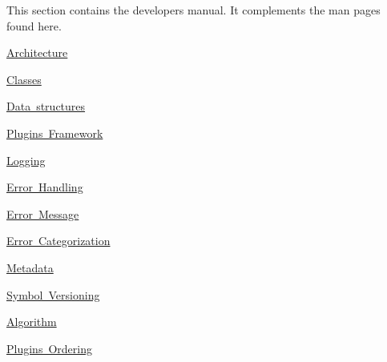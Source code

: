 This section contains the developer\textquotesingle{}s manual. It complements the man pages found here.


\begin{DoxyItemize}
\item \mbox{\hyperlink{doc_dev_architecture_md}{Architecture}}
\item \mbox{\hyperlink{doc_dev_classes_md}{Classes}}
\item \mbox{\hyperlink{doc_dev_data-structures_md}{Data structures}}
\item \mbox{\hyperlink{doc_dev_plugins-framework_md}{Plugins Framework}}
\end{DoxyItemize}


\begin{DoxyItemize}
\item \mbox{\hyperlink{doc_dev_logging_md}{Logging}}
\item \mbox{\hyperlink{doc_dev_error-handling_md}{Error Handling}}
\item \mbox{\hyperlink{doc_dev_error-message_md}{Error Message}}
\item \mbox{\hyperlink{doc_dev_error-categorization_md}{Error Categorization}}
\item \mbox{\hyperlink{doc_dev_metadata_md}{Metadata}}
\item \mbox{\hyperlink{doc_dev_symbol-versioning_md}{Symbol Versioning}}
\end{DoxyItemize}


\begin{DoxyItemize}
\item \mbox{\hyperlink{doc_dev_algorithm_md}{Algorithm}}
\item \mbox{\hyperlink{doc_dev_plugins-ordering_md}{Plugins Ordering}} 
\end{DoxyItemize}